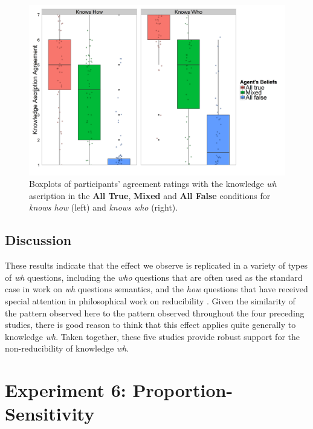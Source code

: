 \documentclass[a4paper]{article}
\begin{document}
\begin{figure}[h!]
\centering
\includegraphics[width=14cm] {Fig5}
\captionsetup{width=0.9\textwidth}
\caption{Boxplots of participants' agreement ratings with the knowledge \textit{wh} ascription in the \textbf{All True}, \textbf{Mixed} and \textbf{All False} conditions for \textit{knows how} (left) and \textit{knows who} (right).}
\label{fig:Fig6}
\end{figure}

\subsection{Discussion}

These results indicate that the effect we observe is replicated in a variety of types of \textit{wh} questions, including the \textit{who} questions that are often used as the standard case in work on \textit{wh} questions semantics, and the \textit{how} questions that have received special attention in philosophical work on reducibility \citep{ryle:knowhow,stanley:knowhow}. Given the similarity of the pattern observed here to the pattern observed throughout the four preceding studies, there is good reason to think that this effect applies quite generally to knowledge \textit{wh}. Taken together, these five studies provide robust support for the non-reducibility of knowledge \textit{wh}.

\section{Experiment 6: Proportion-Sensitivity}\label{proportionalsec}
\end{document}
